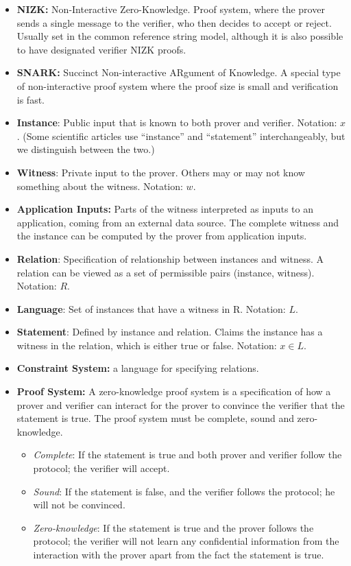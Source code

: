\begin{itemize}[leftmargin=1em]
 
\item \textbf{NIZK:} Non-Interactive Zero-Knowledge.
Proof system, where the prover sends a single message to the verifier, who then decides to accept or reject. Usually set in the common reference string model, although it is also possible to have designated verifier NIZK proofs.
 
\item \textbf{SNARK:} 
Succinct Non-interactive ARgument of Knowledge.
A special type of non-interactive proof system where the proof size is small and verification is fast.
 
\item \textbf{Instance}: Public input that is known to both prover and verifier.
Notation: $x$.
(Some scientific articles use ``instance'' and ``statement'' interchangeably, but we distinguish between the two.)
    
\item \textbf{Witness}: Private input to the prover. Others may or may not know something about the witness. Notation: $w$.
\item \textbf{Application Inputs:} Parts of the witness interpreted as inputs to an application, coming from an external data source. The complete witness and the instance can be computed by the prover from application inputs.
\item \textbf{Relation}: Specification of relationship between instances and witness. A relation can be viewed as a set of permissible pairs (instance, witness). Notation: $R$.
\item \textbf{Language}: Set of instances that have a witness in R. Notation: $L$.
\item \textbf{Statement}: Defined by instance and relation. Claims the instance has a witness in the relation, which is either true or false. Notation: $x \in L$.
\item \textbf{Constraint System:} a language for specifying relations.

\item \textbf{Proof System:} A zero-knowledge proof system is a specification of how a prover and verifier can interact for the prover to convince the verifier that the statement is true. The proof system must be complete, sound and zero-knowledge.
\begin{itemize}[leftmargin=1em]
	\item \emph{Complete}: If the statement is true and both prover and verifier follow the protocol; the verifier will accept.
	\item \emph{Sound}: If the statement is false, and the verifier follows the protocol; he will not be convinced.
	\item \emph{Zero-knowledge}: If the statement is true and the prover follows the protocol; the verifier will not learn any confidential information from the interaction with the prover apart from the fact the statement is true.
\end{itemize}


\end{itemize}
